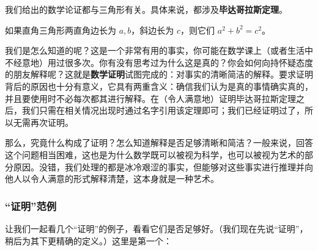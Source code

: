 我们给出的数学论证都与三角形有关。具体来说，都涉及\textbf{毕达哥拉斯定理}。

\begin{theorem}[毕达哥拉斯定理] \label{thm:pythagorean}
    如果直角三角形两直角边长为 $a,b$，斜边长为 $c$，则它们 $a^2+b^2=c^2$。
\end{theorem}

\begin{center}
\end{center}

我们是怎么知道的呢？这是一个非常有用的事实，你可能在数学课上（或者生活中不经意地）用过很多次。你有没有思考过为什么这是真的？你会如何向持怀疑态度的朋友解释呢？这就是\textbf{数学证明}试图完成的：对事实的清晰简洁的解释。要求证明背后的原因也十分有意义，它具有两重含义：确信我们认为是真的事情确实真的，并且要使用时不必每次都其进行解释。在（令人满意地）证明毕达哥拉斯定理之后，我们只需在相关情况出现时通过名字引用该定理即可；我们已经证明过了，所以无需再次证明。

那么，究竟什么构成了证明？怎么知道解释是否足够清晰和简洁？一般来说，回答这个问题相当困难，这也是为什么数学既可以被视为科学，也可以被视为艺术的部分原因。没错，我们处理的都是冰冷艰涩的事实，但能够对这些事实进行推理并向他人以令人满意的形式解释清楚，这本身就是一种艺术。

\subsubsection*{“证明”范例}

让我们一起看几个“证明”的例子，看看它们是否足够好。（我们现在先说“证明”，稍后为其下更精确的定义。）这里是第一个：

